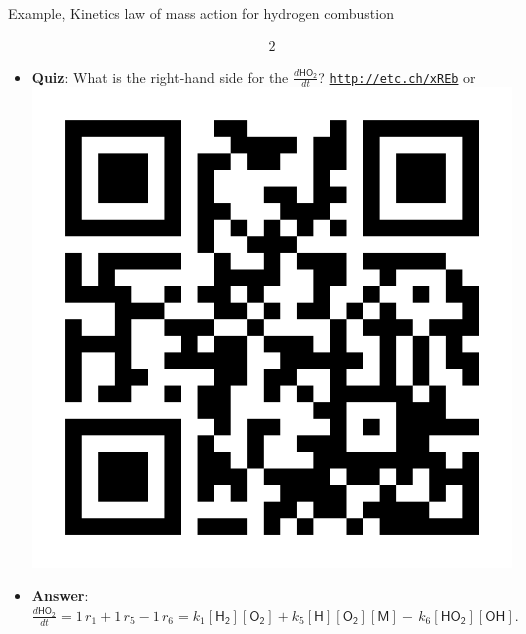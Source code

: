 \begin{frame}{Example, Kinetics law of mass action for hydrogen combustion}
\begin{itemize}
{\begin{alignat*}{2}
			\end{alignat*}
		}
		\item \alert{\bf Quiz}: What is the right-hand side for the $\tfrac{d\mathsf{HO_2}}{dt}$?
			\href{http://etc.ch/xREb}{\textcolor{indigo(dye)}{\tt http://etc.ch/xREb}} \quad or \quad
			\includegraphics[height=0.08\columnwidth]{figures/chemical-kinetics/polls.png}
		\vskip 10pt
		\hiddenpause
		\item {\bf Answer}:  $\tfrac{d\mathsf{HO_2}}{dt} = 1 \, r_1  + 1 \, r_5 -1  \, r_6 = k_1  \mathsf{[H_2][O_2] } + k_5  \mathsf{[H][O_2][M]}  - \, k_6  \mathsf{[HO_2][OH] }.$
	\end{itemize}
\end{frame}
%
%
